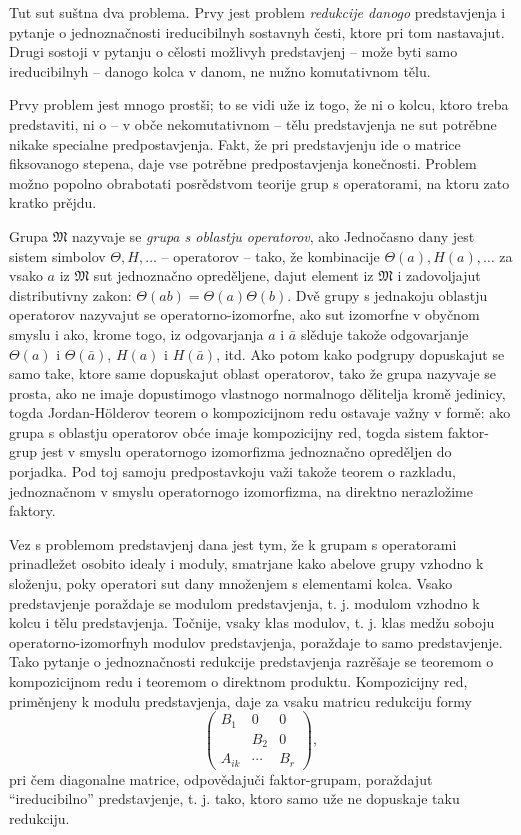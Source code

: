 \documentclass[11pt]{article}
\begin{document}
Tut sut suštna dva problema. Prvy jest problem \emph{redukcije danogo} predstavjenja i pytanje o jednoznačnosti ireducibilnyh sostavnyh česti, ktore pri tom nastavajut. Drugi sostoji v pytanju o cělosti možlivyh predstavjenj -- može byti samo ireducibilnyh -- danogo kolca v danom, ne nužno komutativnom tělu.

Prvy problem jest mnogo prostši; to se vidi uže iz togo, že ni o kolcu, ktoro treba predstaviti, ni o -- v obče nekomutativnom -- tělu predstavjenja ne sut potrěbne nikake specialne predpostavjenja. Fakt, že pri predstavjenju ide o matrice fiksovanogo stepena, daje vse potrěbne predpostavjenja konečnosti. Problem možno popolno obrabotati posrědstvom teorije grup s operatorami, na ktoru zato kratko prějdu.

Grupa $\mathfrak{M}$ nazyvaje se \emph{grupa s oblastju operatorov}, ako Jednočasno dany jest sistem simbolov $\Theta,H,\ldots$ -- operatorov -- tako, že kombinacije $\Theta(a),H(a),\ldots$ za vsako $a$ iz $\mathfrak{M}$ sut jednoznačno opreděljene, dajut element iz $\mathfrak{M}$ i zadovoljajut distributivny zakon: $\Theta(ab)=\Theta(a)\Theta(b)$. Dvě grupy s jednakoju oblastju operatorov nazyvajut se operatorno-izomorfne, ako sut izomorfne v obyčnom smyslu i ako, krome togo, iz odgovarjanja $a$ i $\bar a$ slěduje takože odgovarjanje $\Theta(a)$ i $\Theta(\bar a)$, $H(a)$ i $H(\bar a)$, itd. Ako potom kako podgrupy dopuskajut se samo take, ktore same dopuskajut oblast operatorov, tako že grupa nazyvaje se prosta, ako ne imaje dopustimogo vlastnogo normalnogo dělitelja kromě jedinicy, togda Jordan-Hölderov teorem o kompozicijnom redu ostavaje važny v formě: ako grupa s oblastju operatorov obće imaje kompozicijny red, togda sistem faktor-grup jest v smyslu operatornogo izomorfizma jednoznačno opreděljen do porjadka. Pod toj samoju predpostavkoju važi takože teorem o razkladu, jednoznačnom v smyslu operatornogo izomorfizma, na direktno nerazložime faktory.

Vez s problemom predstavjenj dana jest tym, že k grupam s operatorami prinadležet osobito idealy i moduly, smatrjane kako abelove grupy vzhodno k složenju, poky operatori sut dany množenjem s elementami kolca. Vsako predstavjenje poraždaje se modulom predstavjenja, t. j. modulom vzhodno k kolcu i tělu predstavjenja. Točnije, vsaky klas modulov, t. j. klas medžu soboju operatorno-izomorfnyh modulov predstavjenja, poraždaje to samo predstavjenje. Tako pytanje o jednoznačnosti redukcije predstavjenja razrěšaje se teoremom o kompozicijnom redu i teoremom o direktnom produktu. Kompozicijny red, priměnjeny k modulu predstavjenja, daje za vsaku matricu redukciju formy
\[
\begin{pmatrix}
B_1&0&0\\
&B_2&0\\
A_{ik}&\cdots&B_r
\end{pmatrix},
\]
pri čem diagonalne matrice, odpovědajuči faktor-grupam, poraždajut “ireducibilno” predstavjenje, t. j. tako, ktoro samo uže ne dopuskaje taku redukciju.
\end{document}
